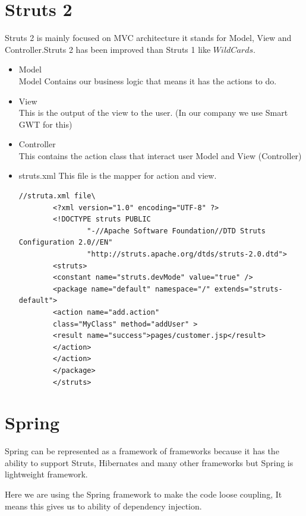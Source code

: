 \documentclass[12pt,a4paper]{report}
\begin{document}
\section{Struts 2}

Struts 2 is mainly focused on MVC architecture it stands for Model, View and Controller.Struts 2 has been improved than Struts 1 like $Wild Cards$. 

\begin{itemize}
\item Model\\
Model Contains our business logic that means it has the actions to do.
\item View\\
This is the output of the view to the user. (In our company we use Smart GWT for this)
\item Controller\\
This contains the action class that interact user Model and View (Controller)
\item struts.xml
This file is the mapper for action and view.
\begin{lstlisting}
//struta.xml file\
        <?xml version="1.0" encoding="UTF-8" ?>
        <!DOCTYPE struts PUBLIC
                "-//Apache Software Foundation//DTD Struts Configuration 2.0//EN"
                "http://struts.apache.org/dtds/struts-2.0.dtd">
        <struts>
        <constant name="struts.devMode" value="true" />
        <package name="default" namespace="/" extends="struts-default">
        <action name="add.action"
        class="MyClass" method="addUser" >
        <result name="success">pages/customer.jsp</result>
        </action>
        </action>
        </package>
        </struts>
\end{lstlisting}
\end{itemize}

\section{Spring}
Spring can be represented as a framework of frameworks because it has the ability to support Struts, Hibernates and many other frameworks but Spring is lightweight framework. 

Here we are using the Spring framework to make the code loose coupling, It means this gives us to ability of dependency injection. 
\end{document}
